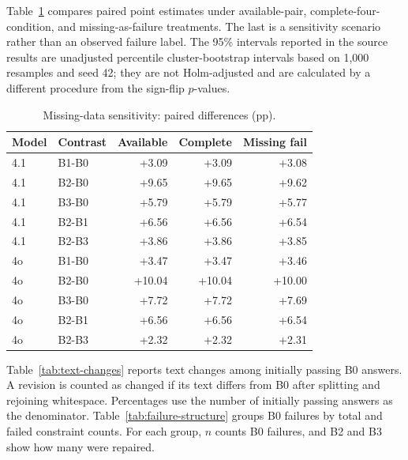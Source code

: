 Table~\ref{tab:robustness} compares paired point estimates under available-pair, complete-four-condition, and missing-as-failure treatments. The last is a sensitivity scenario rather than an observed failure label. The 95\% intervals reported in the source results are unadjusted percentile cluster-bootstrap intervals based on 1,000 resamples and seed 42; they are not Holm-adjusted and are calculated by a different procedure from the sign-flip $p$-values.
\begin{table}[!t]
\caption{Missing-data sensitivity: paired differences (pp).}
\label{tab:robustness}
\centering\footnotesize
\begin{tabular}{llrrr}
\toprule
Model & Contrast & Available & Complete & Missing fail \\
\midrule

4.1 & B1-B0 & +3.09 & +3.09 & +3.08 \\

4.1 & B2-B0 & +9.65 & +9.65 & +9.62 \\

4.1 & B3-B0 & +5.79 & +5.79 & +5.77 \\

4.1 & B2-B1 & +6.56 & +6.56 & +6.54 \\

4.1 & B2-B3 & +3.86 & +3.86 & +3.85 \\

4o & B1-B0 & +3.47 & +3.47 & +3.46 \\

4o & B2-B0 & +10.04 & +10.04 & +10.00 \\

4o & B3-B0 & +7.72 & +7.72 & +7.69 \\

4o & B2-B1 & +6.56 & +6.56 & +6.54 \\

4o & B2-B3 & +2.32 & +2.32 & +2.31 \\

\bottomrule
\end{tabular}
\end{table}

Table~\ref{tab:text-changes} reports text changes among initially passing B0 answers. A revision is counted as changed if its text differs from B0 after splitting and rejoining whitespace. Percentages use the number of initially passing answers as the denominator. Table~\ref{tab:failure-structure} groups B0 failures by total and failed constraint counts. For each group, $n$ counts B0 failures, and B2 and B3 show how many were repaired.

